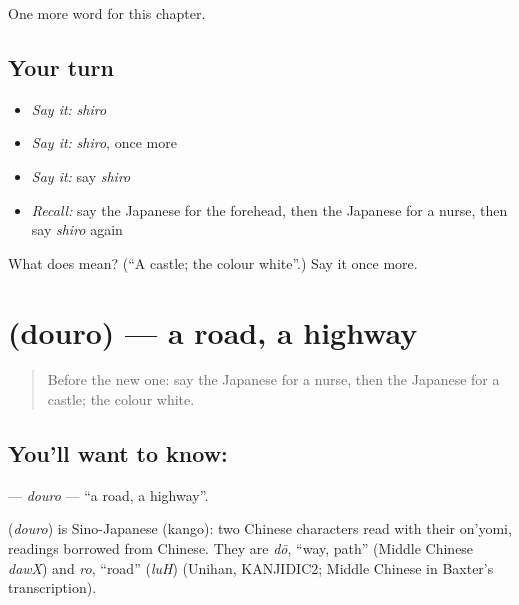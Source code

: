 \begin{grammarlens}[title={What you've built}]
One more word for this chapter.
\end{grammarlens}

\subsection*{Your turn}
\begin{itemize}
\raggedright
  \item \emph{Say it:} \emph{shiro}
  \item \emph{Say it:} \emph{shiro}, once more
  \item \emph{Say it:} say \emph{shiro}
  \item \emph{Recall:} say the Japanese for the forehead, then the Japanese for a nurse, then say \emph{shiro} again
\end{itemize}

\begin{tcolorbox}[breakable,colback=teal!4,colframe=teal!35!black,title={Before you move on}]
What does  mean? (\textquotedblleft{}A castle; the colour white\textquotedblright{}.) Say it once more.
\end{tcolorbox}
\section[\texorpdfstring{\ja{どうろ} (douro)}{どうろ (douro)}]{ (douro) — a road, a highway}

\label{lesson:JA-C111-douro}



\begin{quote}
Before the new one: say the Japanese for a nurse, then the Japanese for a castle; the colour white.
\end{quote}

\subsection*{You'll want to know: }
\textbf{} — \emph{douro} — \textquotedblleft{}a road, a highway\textquotedblright{}.

\begin{cousinweb}
\textbf{} (\emph{douro}) is Sino-Japanese (kango): two Chinese characters read with their on'yomi, readings borrowed from Chinese. They are \emph{dō}, \textquotedblleft{}way, path\textquotedblright{} (Middle Chinese \emph{dawX}) and \emph{ro}, \textquotedblleft{}road\textquotedblright{} (\emph{luH}) (Unihan, KANJIDIC2; Middle Chinese in Baxter's transcription).
\end{cousinweb}

